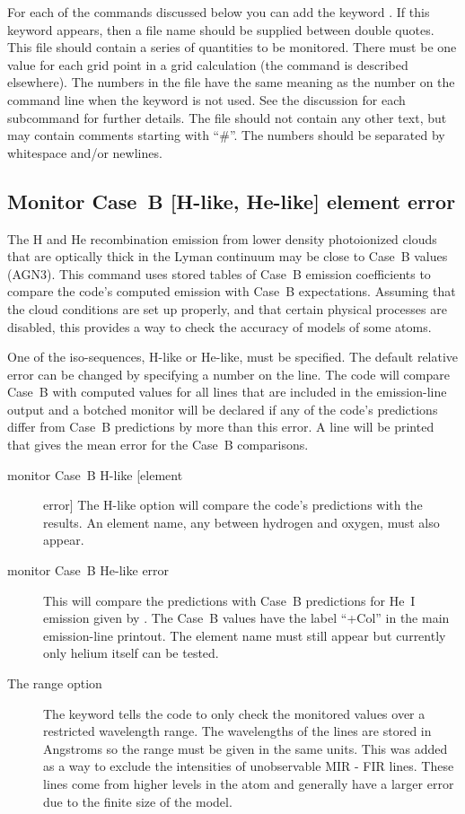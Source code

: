 For each of the commands discussed below you can add the keyword
. If this keyword appears, then a file name should be
supplied between double quotes. This file should contain a series of
quantities to be monitored. There must be one value for each grid point in a
grid calculation (the  command is described elsewhere). The
numbers in the file have the same meaning as the number on the command line
when the  keyword is not used. See the discussion for each
subcommand for further details. The file should not contain any other text,
but may contain comments starting with ``\#''. The numbers should be separated by whitespace and/or
newlines.

\subsection{Monitor Case~B [H-like, He-like]  element error}

The H and He recombination emission from lower density
photoionized clouds
that are optically thick in the Lyman continuum may be
close to Case~B values (AGN3).
This command uses stored tables of Case~B emission coefficients
to compare the code's computed emission with Case~B expectations.
Assuming that the cloud conditions are set up properly,
and that certain physical processes are disabled,
this provides a way to check the accuracy of models
of some atoms.

One of the iso-sequences, H-like or He-like, must be specified.
The default
relative error can be changed by specifying a number on the line.
The code
will compare Case~B with computed values for all lines that are included
in the emission-line output
and a botched monitor will be declared if any
of the code's predictions differ from Case~B predictions by more than this
error.
A line will be printed that gives the mean error for the Case~B
comparisons.
\begin{description}
\item[monitor Case~B H-like [element] error]  The H-like option will compare
the code's predictions with the \citet{Storey1995} results.  An element
name, any between hydrogen and oxygen, must also appear.

\item[monitor Case~B He-like error]  This will compare the predictions with Case~B predictions for He~I emission given by 
\citet{Porter.R12Improved-He-I-emissivities-in-the-case-B-approximation, Porter.R13-CaseB-erratum}.  
The Case~B values have the label ``+Col'' in the main emission-line printout. The
element name must still appear but currently only helium itself can be
tested.

\item[The range option]  The keyword 
tells the code to only check the
monitored values over a restricted wavelength range.
The wavelengths of
the lines are stored in Angstroms so the range must be given in
the same units.
This was added as a way to exclude the intensities of
unobservable MIR - FIR lines.  These lines come from higher levels in the
atom and generally have a larger error due to the finite size of the model.
\end{description}

